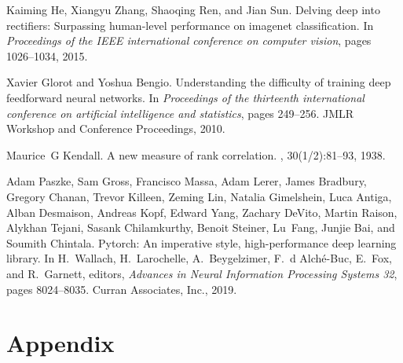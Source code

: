 \documentclass{article}
\begin{document}
\begin{thebibliography}{10}
Kaiming He, Xiangyu Zhang, Shaoqing Ren, and Jian Sun.
\newblock Delving deep into rectifiers: Surpassing human-level performance on
  imagenet classification.
\newblock In {\em Proceedings of the IEEE international conference on computer
  vision}, pages 1026--1034, 2015.

Xavier Glorot and Yoshua Bengio.
\newblock Understanding the difficulty of training deep feedforward neural
  networks.
\newblock In {\em Proceedings of the thirteenth international conference on
  artificial intelligence and statistics}, pages 249--256. JMLR Workshop and
  Conference Proceedings, 2010.

Maurice~G Kendall.
\newblock A new measure of rank correlation.
, 30(1/2):81--93, 1938.

Adam Paszke, Sam Gross, Francisco Massa, Adam Lerer, James Bradbury, Gregory
  Chanan, Trevor Killeen, Zeming Lin, Natalia Gimelshein, Luca Antiga, Alban
  Desmaison, Andreas Kopf, Edward Yang, Zachary DeVito, Martin Raison, Alykhan
  Tejani, Sasank Chilamkurthy, Benoit Steiner, Lu~Fang, Junjie Bai, and Soumith
  Chintala.
\newblock Pytorch: An imperative style, high-performance deep learning library.
\newblock In H.~Wallach, H.~Larochelle, A.~Beygelzimer, F.~d\textquotesingle
  Alch\'{e}-Buc, E.~Fox, and R.~Garnett, editors, {\em Advances in Neural
  Information Processing Systems 32}, pages 8024--8035. Curran Associates,
  Inc., 2019.

\end{thebibliography}





\appendix
\section{Appendix}
\end{document}
